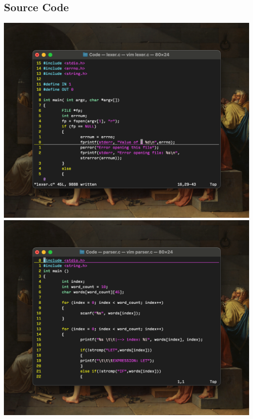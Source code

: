 \documentclass{report}
\begin{document}
\subsection*{Source Code}
\includegraphics[width =\textwidth]{code_lex.png}
\includegraphics[width =\textwidth]{code_parse.png}
\end{document}
